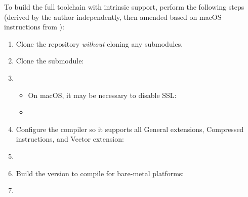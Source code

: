 To build the full toolchain with intrinsic support, perform the following steps (derived by the author independently, then amended based on macOS instructions from ):
\begin{enumerate}
    \item Clone the repository \emph{without} cloning any submodules.
    
    \item Clone the  submodule:
    \item[\code{\$}] 
    \begin{itemize}
        \item On macOS, it may be necessary to disable SSL:
        \item[\code{\$}] 
    \end{itemize}
    \item Configure the compiler so it supports all General extensions, Compressed instructions, and Vector extension:
    \item[\code{\$}] 
    \item Build the  version to compile for bare-metal platforms:
    \item[\code{\$}] 
\end{enumerate}
